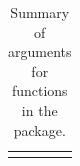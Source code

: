 \begin{center}
\begin{longtable}{l p{11.75 cm}}
		\bottomrule\caption{Summary of arguments for functions in the \pkg{IndexNumber} package.}\label{table2}
	\end{longtable}
\end{center}


